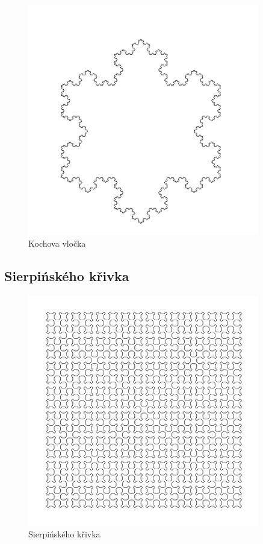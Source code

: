 \begin{figure}[p]
  \centering

  \includegraphics[width=0.9\textwidth]{krunimir/examples/koch}
  \caption{Kochova vločka}\label{fig:krunimir-koch}
\end{figure}

\subsection{Sierpińského křivka}



\begin{figure}[p]
  \centering

  \includegraphics[width=0.9\textwidth]{krunimir/examples/sierpinski}
  \caption{Sierpińského křivka}\label{fig:krunimir-sierpinski}
\end{figure}

